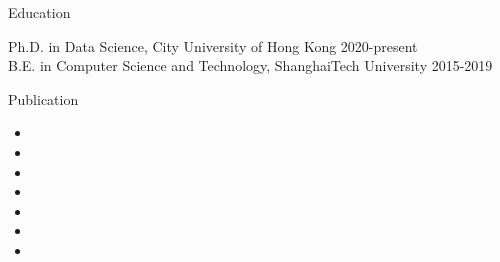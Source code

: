 \documentclass{resume} %
\begin{document}

\begin{rSection}{Education}

{Ph.D. in Data Science}, City University of Hong Kong  \hfill {2020-present}\\
{B.E. in Computer Science and Technology}, ShanghaiTech University \hfill {2015-2019}

\end{rSection}

\begin{rSection}{Publication}

    
    \begin{itemize}
        \item {}
        \item {}
        \item {}
        \item {}
        \item {}
        \item {}
        \item {}
    \end{itemize}
    
\end{rSection}

\end{document}
